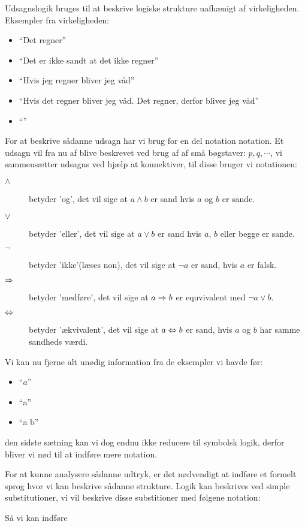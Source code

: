 Udsagnslogik bruges til at beskrive logiske strukture uafhænigt af virkeligheden.
Eksempler fra virkeligheden:
\begin{itemize}
    \item ``Det regner''
    \item ``Det er ikke sandt at det ikke regner''
    \item ``Hvis jeg regner bliver jeg våd''
    \item ``Hvis det regner bliver jeg våd. Det regner, derfor bliver jeg våd''
    \item ``''
\end{itemize}

For at beskrive sådanne udsagn har vi brug for en del notation notation. Et udsagn vil fra nu af blive beskrevet ved brug af af små bøgstaver: $p, q, \cdots$,
vi sammensætter udsagns ved hjælp at konnektiver, til disse bruger vi notationen:

\begin{description}
    \item[$\land$] betyder 'og', det vil sige at $a \land b$ er sand hvis $a$ og $b$ er sande.
    \item[$\lor$] betyder 'eller', det vil sige at $a \lor b$ er sand hvis $a$, $b$ eller begge er sande.
    \item[$\lnot$] betyder 'ikke'(læses non), det vil sige at $\lnot a$ er sand, hvis $a$ er falsk.
    \item[$\imp$] betyder 'medføre', det vil sige at $a \imp b$ er equvivalent med $\lnot a \lor b$.
    \item[$\bimp$] betyder 'ækvivalent', det vil sige at $a \bimp b$ er sand, hvis $a$ og $b$ har samme sandheds værdi.
\end{description}

Vi kan nu fjerne alt unødig information fra de eksempler vi havde før:
\begin{itemize}
    \item ``$a$''
    \item ``\lnot \lnot a''
    \item ``a \imp b''
\end{itemize}

den sidste sætning kan vi dog endnu ikke reducere til symbolsk logik, derfor bliver vi nød til at indføre mere notation.

\begin{prooftree}
\end{prooftree}

For at kunne analysere sådanne udtryk, er det nødvendigt at indføre et formelt sprog hvor vi kan beskrive sådanne strukture.
Logik kan beskrives ved simple substitutioner,  vi vil beskrive disse substitioner med følgene notation:

Så vi kan indføre
